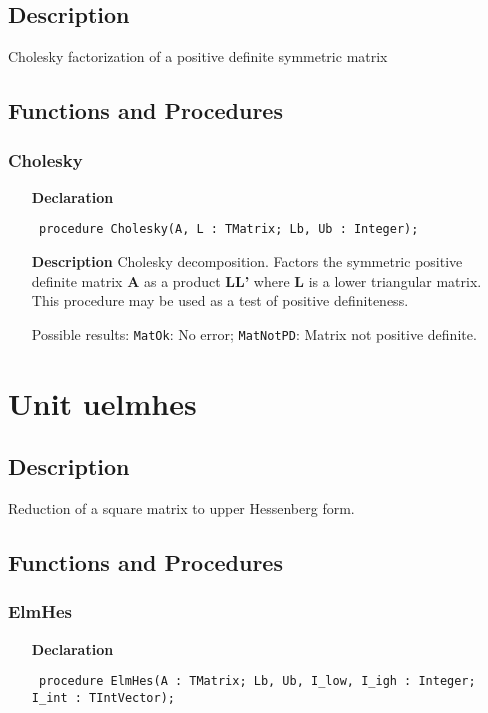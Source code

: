 \documentclass[12pt,a4paper,oneside]{report}
\newcommand{\declarationitem}[1]{\textbf{#1}}
\newcommand{\descriptiontitle}[1]{\textbf{#1}}
\newcommand{\code}[1]{\texttt{#1}}
\begin{document}
\subsection{Description}
Cholesky factorization of a positive definite symmetric matrix
\subsection{Functions and Procedures}
\subsubsection{Cholesky}
\label{ucholesk-Cholesky}
\begin{itemize}\item[\declarationitem{Declaration}\hfill]
	\begin{flushleft}
		\code{
			procedure Cholesky(A, L : TMatrix; Lb, Ub : Integer);}
		
	\end{flushleft}
	
	\par
	\item[\descriptiontitle{Description}]
	Cholesky decomposition. Factors the symmetric positive definite matrix \textbf{A} as a product \textbf{LL'} where \textbf{L} is a lower triangular matrix. This procedure may be used as a test of positive definiteness.
	
	Possible results: \code{MatOk}: No error; \code{MatNotPD}: Matrix not positive definite.
	
\end{itemize}

\section{Unit uelmhes}
\label{uelmhes}
\subsection{Description}
Reduction of a square matrix to upper Hessenberg form. 
\subsection{Functions and Procedures}
\subsubsection{ElmHes}
\label{uelmhes-ElmHes}
\begin{itemize}\item[\declarationitem{Declaration}\hfill]
	\begin{flushleft}
		\code{
			procedure ElmHes(A : TMatrix; Lb, Ub, I{\_}low, I{\_}igh : Integer; I{\_}int : TIntVector);}
	\end{flushleft}
\end{itemize}
\end{document}
